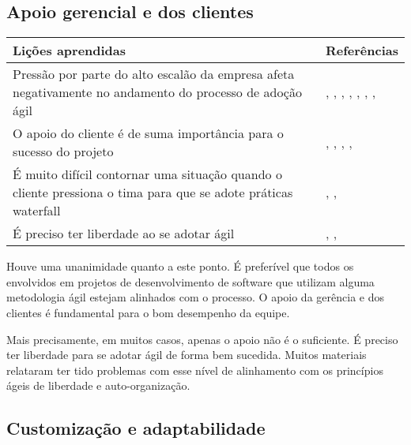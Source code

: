 \subsection{Apoio gerencial e dos clientes}

\begin{table}[H]
	\centering
	\begin{tabularx}{\linewidth}{ | X | p{5cm} | } \hline \textbf{Lições aprendidas} & \textbf{Referências} \\ \hline
		Pressão por parte do alto escalão da empresa afeta negativamente no andamento do processo de adoção ágil & \cite{Hajjdiab2011}, \cite{Cisco2011}, \cite{Claudia2013}, \cite{Parzinello2012}, \cite{Stefano2013}, \cite{Bastos2013}, \cite{Maciel2013}, \cite{Srinath2012} \\ \hline
		O apoio do cliente é de suma importância para o sucesso do projeto & \cite{Arikpo2011}, \cite{Claudia2013}, \cite{Parzinello2012}, \cite{Stefano2013}, \cite{Maciel2013} \\ \hline
		É muito difícil contornar uma situação quando o cliente pressiona o tima para que se adote práticas waterfall & \cite{Claudia2013}, \cite{Piegas2012}, \cite{Srinath2012} \\ \hline
		É preciso ter liberdade ao se adotar ágil & \cite{Piegas2012}, \cite{Stefano2013}, \cite{Maciel2013} \\ \hline
	\end{tabularx}
\end{table}

Houve uma unanimidade quanto a este ponto. É preferível que todos os envolvidos em projetos de desenvolvimento de software que utilizam alguma metodologia ágil estejam alinhados com o processo. O apoio da gerência e dos clientes é fundamental para o bom desempenho da equipe.

Mais precisamente, em muitos casos, apenas o apoio não é o suficiente. É preciso ter liberdade para se adotar ágil de forma bem sucedida. Muitos materiais \cite{Piegas2012,Stefano2013,Maciel2013} relataram ter tido problemas com esse nível de alinhamento com os princípios ágeis de liberdade e auto-organização.

\subsection{Customização e adaptabilidade}

